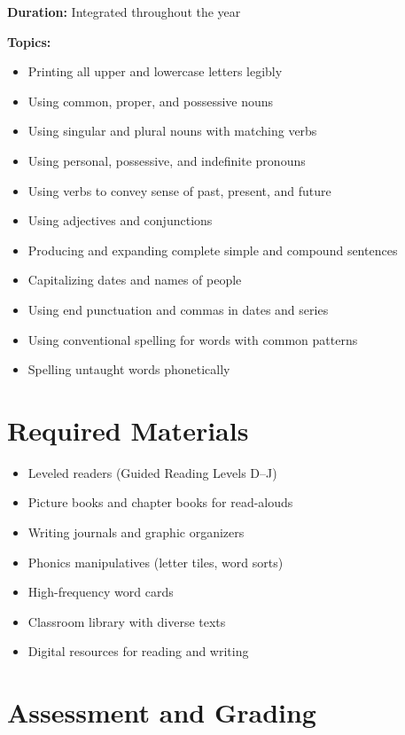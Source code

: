 \documentclass[11pt,letterpaper]{report}
\begin{document}
\textbf{Duration:} Integrated throughout the year

\textbf{Topics:}
\begin{itemize}
    \item Printing all upper and lowercase letters legibly
    \item Using common, proper, and possessive nouns
    \item Using singular and plural nouns with matching verbs
    \item Using personal, possessive, and indefinite pronouns
    \item Using verbs to convey sense of past, present, and future
    \item Using adjectives and conjunctions
    \item Producing and expanding complete simple and compound sentences
    \item Capitalizing dates and names of people
    \item Using end punctuation and commas in dates and series
    \item Using conventional spelling for words with common patterns
    \item Spelling untaught words phonetically
\end{itemize}

\section{Required Materials}

\begin{itemize}
    \item Leveled readers (Guided Reading Levels D--J)
    \item Picture books and chapter books for read-alouds
    \item Writing journals and graphic organizers
    \item Phonics manipulatives (letter tiles, word sorts)
    \item High-frequency word cards
    \item Classroom library with diverse texts
    \item Digital resources for reading and writing
\end{itemize}

\section{Assessment and Grading}
\end{document}
